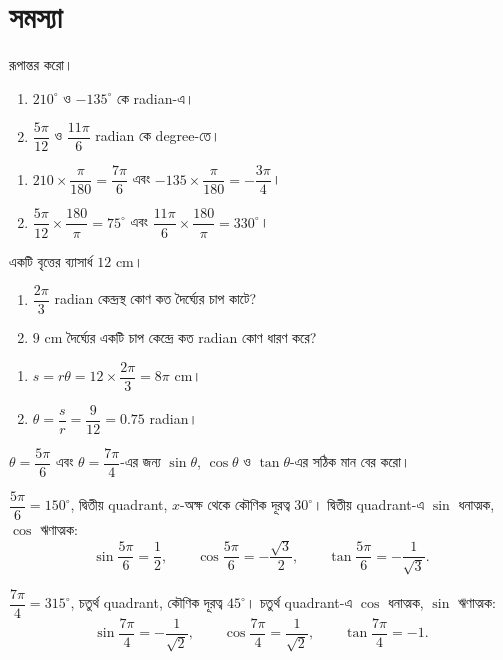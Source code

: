\documentclass[11pt]{article}
\begin{document}
\section{সমস্যা}

 রূপান্তর করো।
\begin{enumerate}
  \item $210^\circ$ ও $-135^\circ$ কে radian-এ।
  \item $\dfrac{5\pi}{12}$ ও $\dfrac{11\pi}{6}$ radian কে degree-তে।
\end{enumerate}

\begin{sol}
\begin{enumerate}
  \item $210 \times \dfrac{\pi}{180} = \dfrac{7\pi}{6}$ এবং
        $-135 \times \dfrac{\pi}{180} = -\dfrac{3\pi}{4}$।
  \item $\dfrac{5\pi}{12} \times \dfrac{180}{\pi} = 75^\circ$ এবং
        $\dfrac{11\pi}{6} \times \dfrac{180}{\pi} = 330^\circ$।
\end{enumerate}
\end{sol}

 একটি বৃত্তের ব্যাসার্ধ $12$ cm।
\begin{enumerate}
  \item $\dfrac{2\pi}{3}$ radian কেন্দ্রস্থ কোণ কত দৈর্ঘ্যের চাপ কাটে?
  \item $9$ cm দৈর্ঘ্যের একটি চাপ কেন্দ্রে কত radian কোণ ধারণ করে?
\end{enumerate}

\begin{sol}
\begin{enumerate}
  \item $s = r\theta = 12 \times \dfrac{2\pi}{3} = 8\pi$ cm।
  \item $\theta = \dfrac{s}{r} = \dfrac{9}{12} = 0.75$ radian।
\end{enumerate}
\end{sol}

 $\theta = \dfrac{5\pi}{6}$ এবং $\theta = \dfrac{7\pi}{4}$-এর জন্য
$\sin\theta$, $\cos\theta$ ও $\tan\theta$-এর সঠিক মান বের করো।

\begin{sol}
$\dfrac{5\pi}{6} = 150^\circ$, দ্বিতীয় quadrant, $x$-অক্ষ থেকে কৌণিক দূরত্ব
$30^\circ$। দ্বিতীয় quadrant-এ $\sin$ ধনাত্মক, $\cos$ ঋণাত্মক:
\[
  \sin\frac{5\pi}{6} = \frac{1}{2}, \qquad
  \cos\frac{5\pi}{6} = -\frac{\sqrt{3}}{2}, \qquad
  \tan\frac{5\pi}{6} = -\frac{1}{\sqrt{3}} .
\]

$\dfrac{7\pi}{4} = 315^\circ$, চতুর্থ quadrant, কৌণিক দূরত্ব $45^\circ$।
চতুর্থ quadrant-এ $\cos$ ধনাত্মক, $\sin$ ঋণাত্মক:
\[
  \sin\frac{7\pi}{4} = -\frac{1}{\sqrt{2}}, \qquad
  \cos\frac{7\pi}{4} = \frac{1}{\sqrt{2}}, \qquad
  \tan\frac{7\pi}{4} = -1 .
\]
\end{sol}
\end{document}

